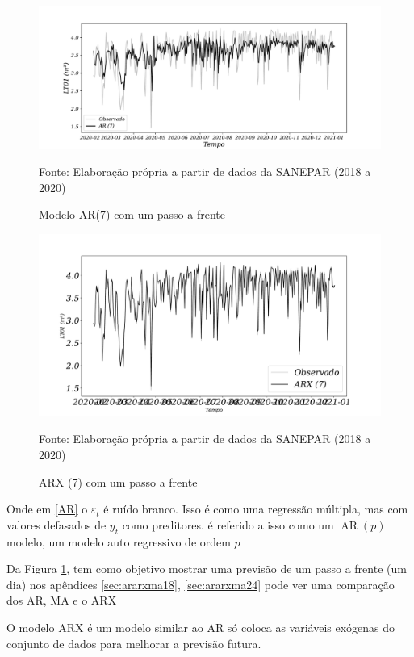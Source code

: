 \begin{figure}[H]
	\centering
	\caption{Modelo AR(7) com um passo a frente}
	\label{fig:1-ar}
	\includegraphics[width=1\linewidth]{Modelos/Figuras/1-AR}
	
	Fonte: Elaboração própria a partir de dados da SANEPAR (2018 a 2020)
\end{figure}

\begin{figure}[H]
	\centering
	\caption{ARX (7) com um passo a frente}
	\label{fig:1-arx}
	\includegraphics[width=1\linewidth]{Modelos/Figuras/1-ARX}
	
	Fonte: Elaboração própria a partir de dados da SANEPAR (2018 a 2020)
\end{figure}



Onde em \eqref{AR} o $\varepsilon_t$ é ruído branco. Isso é como uma regressão múltipla, mas com valores defasados de $y_t$ como preditores. é referido a isso como um $\operatorname{AR}(p)$ modelo, um modelo auto regressivo de ordem $p$

Da Figura \ref{fig:1-ar}, tem como objetivo mostrar uma previsão de um passo a frente (um dia) nos apêndices \ref{sec:ararxma18}, \ref{sec:ararxma24} pode ver uma comparação dos AR, MA e o ARX

O modelo ARX é um modelo similar ao AR só coloca as variáveis exógenas do conjunto de dados para melhorar a previsão futura.

